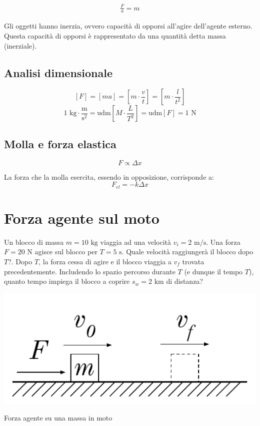 \vspace{8pt}
\begin{tcolorbox}[colback = red!30, colframe = red!30!black, title = {Seconda legge della dinamica}]
    \begin{align}
        \frac{F}{a} = m
    \end{align}
\end{tcolorbox}
\vspace{5pt}

Gli oggetti hanno inerzia, ovvero capacità di opporsi all'agire dell'agente
esterno. Questa capacità di opporsi è rappresentato da una quantità detta
massa (inerziale).

\subsection{Analisi dimensionale}
\[ [F] = [ma] = \left[m\cdot\frac{v}{t}\right] = \left[m\cdot\frac{l}{t^2}\right]  \]
\[ 1\text{ kg}\cdot\frac{\text{m}}{\text{s}^2} = \text{udm}\left[M\cdot\frac{L}{T^2}\right] = \text{udm}[F] = 1\text{ N} \]


\subsection{Molla e forza elastica}
\[ F \propto \Delta x \]

La forza che la molla esercita, essendo in opposizione, corrisponde a:
\[ F_\textit{el} = -k\Delta x \]

\section{Forza agente sul moto}
Un blocco di massa $m = 10 \text{ kg}$ viaggia ad una velocità $v_i =
2 \text{ m/s}$. Una forza $F = 20 \text{ N}$ agisce sul blocco per
$T = 5 \text{ s}$. Quale velocità raggiungerà il blocco dopo $T$?.
Dopo $T$, la forza cessa di agire e il blocco viaggia a $v_f$ trovata
precedentemente. Includendo lo spazio percorso durante $T$ (e dunque il
tempo $T$), quanto tempo impiega il blocco a coprire $s_w = 2\text{ km}$
di distanza?

\begin{marginfigure}
    \centering
    \includegraphics[width = \marginparwidth]{figures/scivola.pdf}
    \caption{Forza agente su una massa in moto}
\end{marginfigure}

